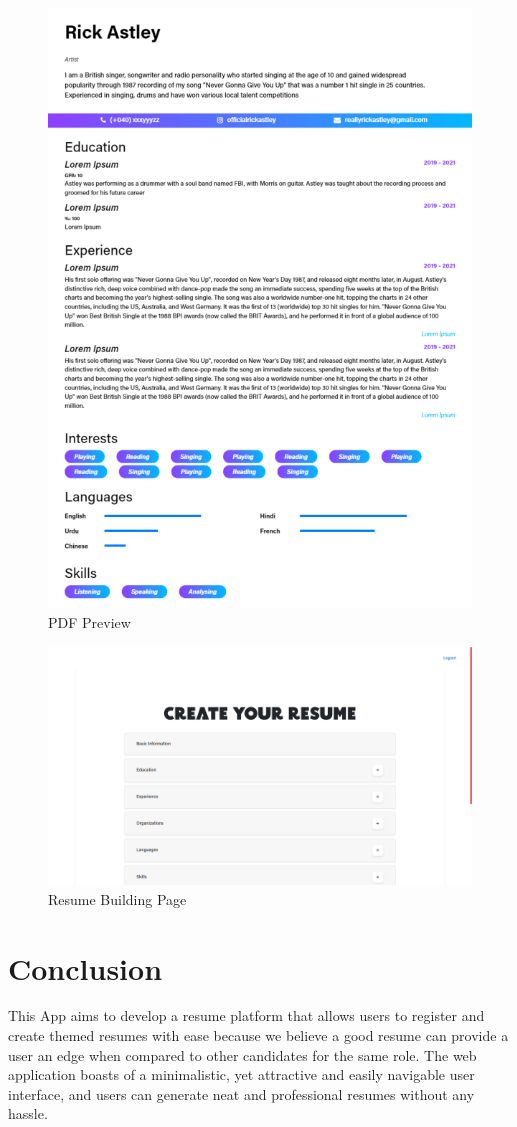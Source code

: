 \documentclass[12pt]{article}
\begin{document}
\begin{figure}[H]
\centering
\includegraphics[width=0.74\linewidth]{SamplePDF.png}
\caption{PDF Preview}
\end{figure}

\begin{figure}[H]
\centering
\includegraphics[width=0.74\linewidth]{Screenshot (134).png}
\caption{Resume Building Page}
\end{figure}

\section*{\LARGE{Conclusion}}
This App aims to develop a resume platform that allows users to register and create themed resumes with ease because we believe a good resume can provide a user an edge when compared to other candidates for the same role. The web application boasts of a minimalistic, yet attractive and easily navigable user interface, and users can generate neat and professional resumes without any hassle. 
\end{document}
